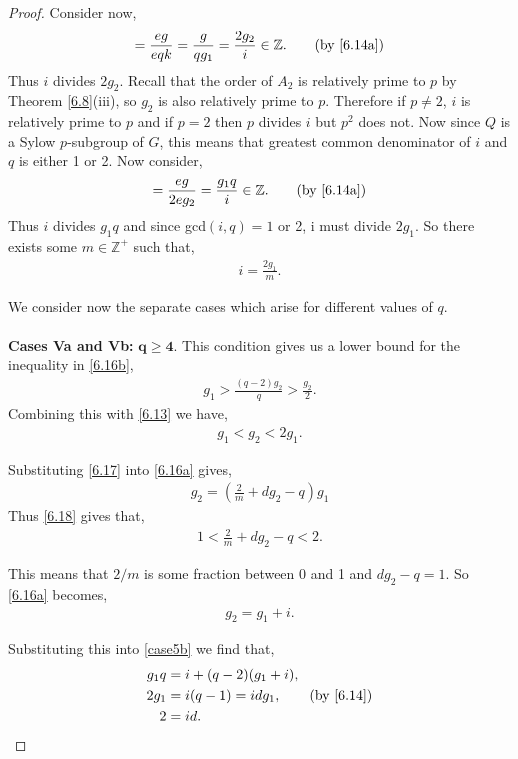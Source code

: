 \begin{proof}
Consider now,
\begin{align*} [G : N_G(Q)] = \frac{eg}{e q k} = \frac{g}{q g_1} = \frac{2 g_2}{i} \in \mathbb{Z}. \tag{by \eqref{6.14a}}
\end{align*}
Thus $i$ divides $2 g_2$. Recall that the order of $A_2$ is relatively prime to $p$ by Theorem \ref{6.8}(iii), so $g_2$ is also relatively prime to $p$. Therefore if $p \neq 2$, $i$ is relatively prime to $p$ and if $p=2$ then $p$ divides $i$ but $p^2$ does not. Now since $Q$ is a Sylow $p$-subgroup of $G$, this means that greatest common denominator of $i$ and $q$ is either 1 or 2.
Now consider,
\begin{align*} [G : N_G(A_2)] = \frac{eg}{2 e g_2} = \frac{g_1 q}{i} \in \mathbb{Z}. \tag{by \eqref{6.14a}}
\end{align*}
Thus $i$ divides $g_1 q$ and since gcd$(i, q) = 1$ or 2, i must divide $2 g_1$. So there exists some $m \in \mathbb{Z^+}$ such that,
\begin{align}\label{6.17} i = \frac{2 g_1}{m}.
\end{align}

We consider now the separate cases which arise for different values of $q$. \\
\\
 \space \textbf{Cases Va and Vb:} $\pmb{q \geq 4}$. This condition gives us a lower bound for the inequality in \eqref{6.16b},
\begin{align*} g_1 > \frac{(q-2) g_2}{q} > \frac{g_2}{2}.
\end{align*}
Combining this with \eqref{6.13} we have,
\begin{align}\label{6.18} g_1 < g_2 < 2 g_1.
\end{align}

Substituting \eqref{6.17} into \eqref{6.16a} gives,
\begin{align*} g_2 = \left( \frac{2}{m} + d g_2 - q \right) g_1
\end{align*}
Thus \eqref{6.18} gives that,
\begin{align*} 1 < \frac{2}{m} + d g_2 - q < 2.
\end{align*}

This means that $2/m$ is some fraction between 0 and 1 and $d g_2 - q = 1$. So \eqref{6.16a} becomes,
\begin{align}\label{6.19} g_2 = g_1 + i.
\end{align}

Substituting this into \eqref{case5b} we find that,
\begin{align*} g_1 q &= i + (q - 2)(g_1 + i),
\\ 2 g_1 &= i(q - 1) = i d g_1, \tag{by \eqref{6.14}}
\\ 2 &= i d.
\end{align*}


\end{proof}
